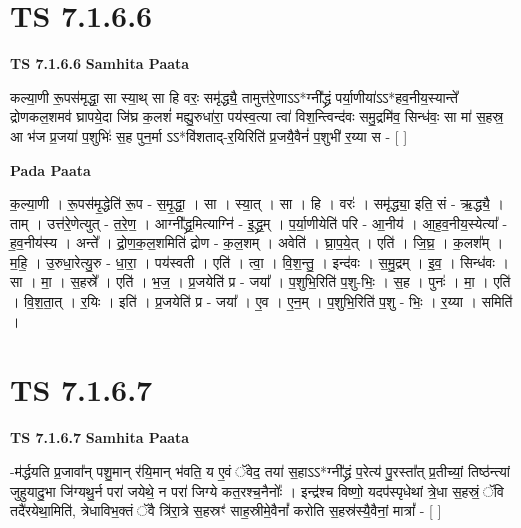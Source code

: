 \documentclass[17pt]{extarticle}
\begin{document}
\section*{ TS 7.1.6.6 }

\textbf{TS 7.1.6.6 } \newline
\textbf{Samhita Paata} \newline

कल्या॒णी रू॒पस॑मृद्धा॒ सा स्या॒थ् सा हि वरः॒ समृ॑द्ध्यै॒ तामुत्त॑रे॒णाऽऽ*ग्नी᳚द्ध्रं पर्या॒णीया॑ऽऽ*हव॒नीय॒स्यान्ते᳚ द्रोणकल॒शमव॑ घ्रापये॒दा जि॑घ्र क॒लशं॑ मह्यु॒रुधा॑रा॒ पय॑स्व॒त्या त्वा॑ विश॒न्त्विन्द॑वः समु॒द्रमि॑व॒ सिन्ध॑वः॒ सा मा॑ स॒हस्र॒ आ भ॑ज प्र॒जया॑ प॒शुभिः॑ स॒ह पुन॒र्मा ऽऽ*वि॑शताद्-र॒यिरिति॑ प्र॒जयै॒वैनं॑ प॒शुभी॑ र॒य्या स - [  ] \newline

\textbf{Pada Paata} \newline

क॒ल्या॒णी । रू॒पस॑मृ॒द्धेति॑ रू॒प - स॒मृ॒द्धा॒ । सा । स्या॒त् । सा । हि । वरः॑ । समृ॑द्ध्या॒ इति॒ सं - ऋ॒द्ध्यै॒ । ताम् । उत्त॑रे॒णेत्युत् - त॒रे॒ण॒ । आग्नी᳚द्ध्र॒मित्याग्नि॑ - इ॒द्ध्र॒म् । प॒र्या॒णीयेति॑ परि - आ॒नीय॑ । आ॒ह॒व॒नीय॒स्येत्या᳚ - ह॒व॒नीय॑स्य । अन्ते᳚ । द्रो॒ण॒क॒ल॒शमिति॑ द्रोण - क॒ल॒शम् । अवेति॑ । घ्रा॒प॒ये॒त् । एति॑ । जि॒घ्र॒ । क॒लश᳚म् । म॒हि॒ । उ॒रुधा॒रेत्यु॒रु - धा॒रा॒ । पय॑स्वती । एति॑ । त्वा॒ । वि॒श॒न्तु॒ । इन्द॑वः । स॒मु॒द्रम् । इ॒व॒ । सिन्ध॑वः । सा । मा॒ । स॒हस्रे᳚ । एति॑ । भ॒ज॒ । प्र॒जयेति॑ प्र - जया᳚ । प॒शुभि॒रिति॑ प॒शु-भिः॒ । स॒ह । पुनः॑ । मा॒ । एति॑ । वि॒श॒ता॒त् । र॒यिः । इति॑ । प्र॒जयेति॑ प्र - जया᳚ । ए॒व । ए॒न॒म् । प॒शुभि॒रिति॑ प॒शु - भिः॒ । र॒य्या । समिति॑ ।  \newline




\section*{ TS 7.1.6.7 }

\textbf{TS 7.1.6.7 } \newline
\textbf{Samhita Paata} \newline

-म॑र्द्धयति प्र॒जावा᳚न् पशु॒मान् र॑यि॒मान् भ॑वति॒ य ए॒वं ॅवेद॒ तया॑ स॒हाऽऽ*ग्नी᳚द्ध्रं प॒रेत्य॑ पु॒रस्ता᳚त् प्र॒तीच्यां॒ तिष्ठ॑न्त्यां जुहुयादु॒भा जि॑ग्यथु॒र्न परा॑ जयेथे॒ न परा॑ जिग्ये कत॒रश्च॒नैनोः᳚ । इन्द्र॑श्च विष्णो॒ यदप॑स्पृधेथां त्रे॒धा स॒हस्रं॒ ॅवि तदै॑रयेथा॒मिति॑, त्रेधाविभ॒क्तं ॅवै त्रि॑रा॒त्रे स॒हस्रꣳ॑ साह॒स्रीमे॒वैनां᳚ करोति स॒हस्र॑स्यै॒वैनां॒ मात्रां᳚ - [  ] \newline
\end{document}
